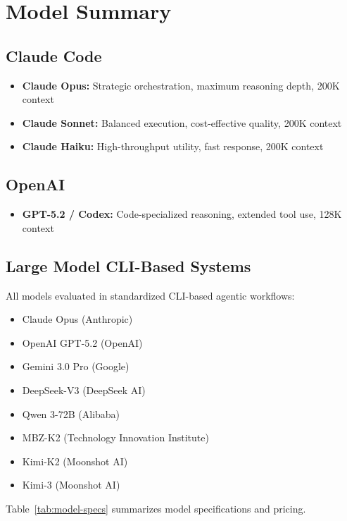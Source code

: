 \documentclass[11pt]{article}
\begin{document}
\section{Model Summary}

\subsection{Claude Code}
\begin{itemize}
    \item \textbf{Claude Opus:} Strategic orchestration, maximum reasoning depth, 200K context
    \item \textbf{Claude Sonnet:} Balanced execution, cost-effective quality, 200K context
    \item \textbf{Claude Haiku:} High-throughput utility, fast response, 200K context
\end{itemize}

\subsection{OpenAI}
\begin{itemize}
    \item \textbf{GPT-5.2 / Codex:} Code-specialized reasoning, extended tool use, 128K context
\end{itemize}

\subsection{Large Model CLI-Based Systems}
All models evaluated in standardized CLI-based agentic workflows:
\begin{itemize}
    \item Claude Opus (Anthropic)
    \item OpenAI GPT-5.2 (OpenAI)
    \item Gemini 3.0 Pro (Google)
    \item DeepSeek-V3 (DeepSeek AI)
    \item Qwen 3-72B (Alibaba)
    \item MBZ-K2 (Technology Innovation Institute)
    \item Kimi-K2 (Moonshot AI)
    \item Kimi-3 (Moonshot AI)
\end{itemize}

Table~\ref{tab:model-specs} summarizes model specifications and pricing.
\end{document}

